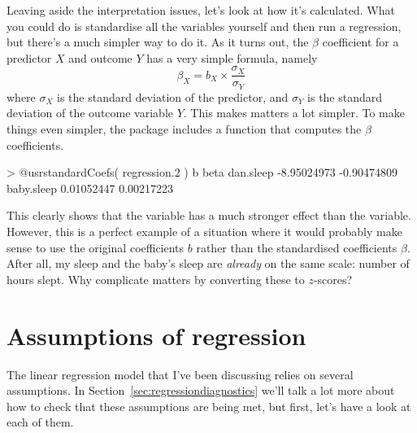 Leaving aside the interpretation issues, let's look at how it's calculated. What you could do is standardise all the variables yourself and then run a regression, but there's a much simpler way to do it. As it turns out, the $\beta$ coefficient for a predictor $X$ and outcome $Y$ has a very simple formula, namely
$$
\beta_X = b_X \times \frac{\sigma_X}{\sigma_Y} 
$$
where $\sigma_X$ is the standard deviation of the predictor, and $\sigma_Y$ is the standard deviation of the outcome variable $Y$. This makes matters a lot simpler. To make things even simpler, the  package includes a function  that computes the $\beta$ coefficients. 
\begin{rblock1}
> @usr{standardCoefs( regression.2 )}
                     b        beta
dan.sleep  -8.95024973 -0.90474809
baby.sleep  0.01052447  0.00217223
\end{rblock1}
This clearly shows that the  variable has a much stronger effect than the  variable. However, this is a perfect example of a situation where it would probably make sense to use the original coefficients $b$ rather than the standardised coefficients $\beta$. After all, my sleep and the baby's sleep are {\it already} on the same scale: number of hours slept. Why complicate matters by converting these to $z$-scores?





\section{Assumptions of regression~\label{sec:regressionassumptions}}

The linear regression model that I've been discussing relies on several assumptions. In Section~\ref{sec:regressiondiagnostics} we'll talk a lot more about how to check that these assumptions are being met, but first, let's have a look at each of them.

